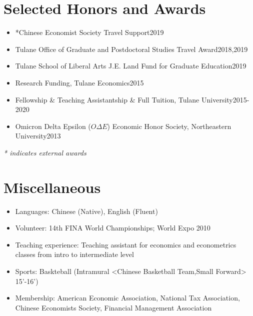 \documentclass{resume}
\begin{document}
\section{Selected Honors and Awards}
\begin{itemize}[parsep=0.25ex]
  \item *Chinese Economist Society Travel Support\hfill 2019
  \item Tulane Office of Graduate and Postdoctoral Studies Travel Award\hfill 2018,2019 
  \item Tulane School of Liberal Arts J.E. Land Fund for Graduate Education\hfill 2019
  \item Research Funding, Tulane Economics\hfill 2015
  \item Fellowship \& Teaching Assistantship \& Full Tuition, Tulane University\hfill 2015-2020 
  \item Omicron Delta Epsilon ($O\Delta E$) Economic Honor Society, Northeastern University\hfill 2013
\end{itemize}
\emph{* indicates external awards}

\section{Miscellaneous}
\begin{itemize}[parsep=0.25ex]
  \item Languages: 
  Chinese (Native), English (Fluent)
  
  \item Volunteer:
  14th FINA World Championships; World Expo 2010
  
  \item Teaching experience:
  Teaching assistant for economics and econometrics classes from intro to intermediate level
  
  \item Sports: 
  Baskteball (Intramural <Chinese Basketball Team,Small Forward> 15'-16')
  
  \item Membership:
American Economic Association, National Tax Association, Chinese Economists Society, Financial Management Association

\end{itemize}

%
%
\end{document}
